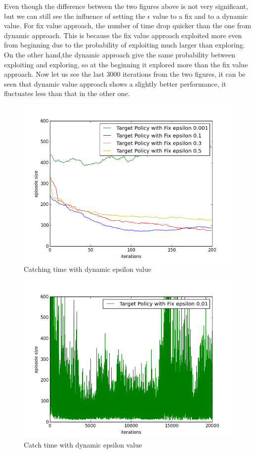 \documentclass[paper=a4, fontsize=11pt]{scrartcl}
\numberwithin{equation}{section}		%
\numberwithin{figure}{section}			%
\numberwithin{table}{section}				%
\begin{document}
Even though the difference between the two figures above is not very significant, but we can still see the influence of setting the $\epsilon$ value to a fix and to a dynamic value. For fix value approach, the number of time drop quicker than the one from dynamic approach. This is because the fix value approach exploited more even from beginning due to the probability of exploiting much larger than exploring. On the other hand,the dynamic approach give the same probability between exploiting and exploring, so at the beginning it explored more than the fix value approach. Now let us see the last 3000 iterations from the two figures, it can be seen that dynamic value approach shows a slightly better performance, it fluctuates less than that in the other one.


\begin{figure}[H] \centering
\includegraphics[scale=0.5]{target_fix_different_epsilon.png}
\caption{Catching time with dynamic epsilon value} \label{figure:dynamicEpsilon}
\end{figure}

\begin{figure}[H] \centering
\includegraphics[scale=0.5]{target_fix_0_001.png}
\caption{Catch time with dynamic epsilon value} 
\end{figure}
\end{document}
